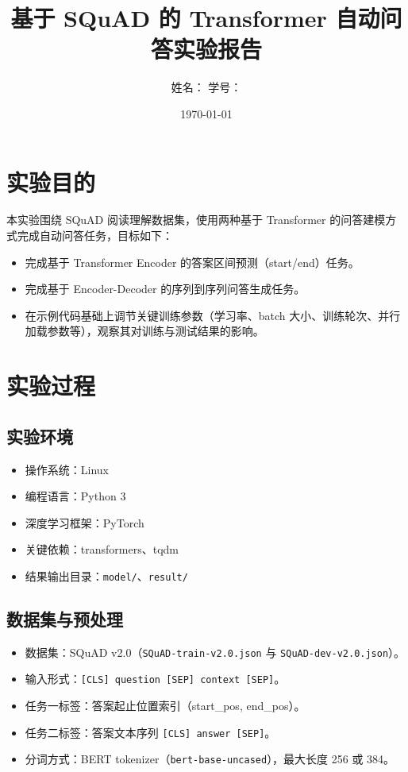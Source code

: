 \documentclass[12pt,a4paper]{ctexart}
\title{基于 SQuAD 的 Transformer 自动问答实验报告}
\author{姓名：\underline{\hspace{3cm}} \quad 学号：\underline{\hspace{3cm}}}
\date{\today}
\begin{document}
\maketitle

\section{实验目的}
本实验围绕 SQuAD 阅读理解数据集，使用两种基于 Transformer 的问答建模方式完成自动问答任务，目标如下：
\begin{itemize}
  \item 完成基于 Transformer Encoder 的答案区间预测（start/end）任务。
  \item 完成基于 Encoder-Decoder 的序列到序列问答生成任务。
  \item 在示例代码基础上调节关键训练参数（学习率、batch 大小、训练轮次、并行加载参数等），观察其对训练与测试结果的影响。
\end{itemize}

\section{实验过程}
\subsection{实验环境}
\begin{itemize}
  \item 操作系统：Linux
  \item 编程语言：Python 3
  \item 深度学习框架：PyTorch
  \item 关键依赖：transformers、tqdm
  \item 结果输出目录：\texttt{model/}、\texttt{result/}
\end{itemize}

\subsection{数据集与预处理}
\begin{itemize}
  \item 数据集：SQuAD v2.0（\texttt{SQuAD-train-v2.0.json} 与 \texttt{SQuAD-dev-v2.0.json}）。
  \item 输入形式：\texttt{[CLS] question [SEP] context [SEP]}。
  \item 任务一标签：答案起止位置索引（start\_pos, end\_pos）。
  \item 任务二标签：答案文本序列 \texttt{[CLS] answer [SEP]}。
  \item 分词方式：BERT tokenizer（\texttt{bert-base-uncased}），最大长度 256 或 384。
\end{itemize}
\end{document}
